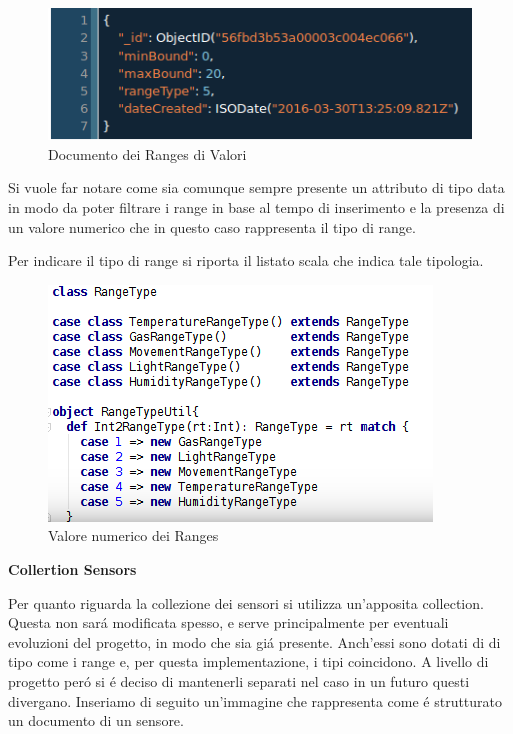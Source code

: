 \begin{figure}[ht]
\centering
\includegraphics[width=\textwidth,natwidth=610,natheight=642]{Figures/DataStructures/RangesValues.png}
\caption{Documento dei Ranges di Valori}
\end{figure}

Si vuole far notare come sia comunque sempre presente un attributo di tipo data in modo da poter filtrare i range in base al tempo di inserimento e la presenza di un valore numerico che in questo caso rappresenta il tipo di range.

Per indicare il tipo di range si riporta il listato scala che indica tale tipologia.

\begin{figure}[ht]
\centering
\includegraphics[scale=0.5,natwidth=610,natheight=642]{Figures/DataStructures/Ranges.png}
\caption{Valore numerico dei Ranges}
\end{figure}

\begin{center}
  \textbf{Collertion Sensors}
\end{center}

Per quanto riguarda la collezione dei sensori si utilizza un'apposita collection. Questa non sar\'a modificata spesso, e serve principalmente per eventuali evoluzioni del progetto, in modo che sia gi\'a presente. Anch'essi sono dotati di di tipo come i range e, per questa implementazione, i tipi coincidono. A livello di progetto per\'o si \'e deciso di mantenerli separati nel caso in un futuro questi divergano. Inseriamo di seguito un'immagine che rappresenta come \'e strutturato un documento di un sensore.

